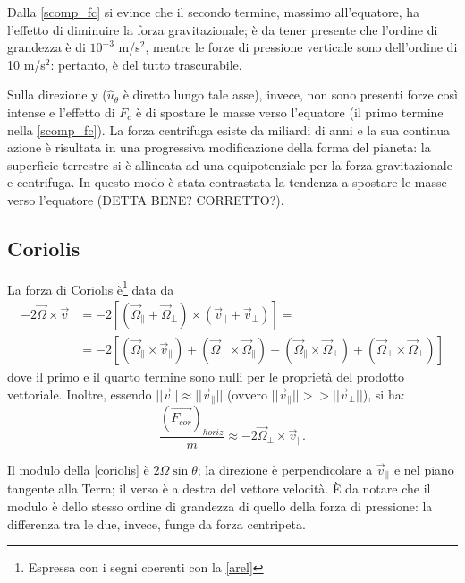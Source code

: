 Dalla \eqref{scomp_fc} si evince che il secondo termine, massimo all'equatore, ha l'effetto di diminuire la forza gravitazionale; è da tener presente che l'ordine di grandezza è di $10^{-3}$ m/s$^2$, mentre le forze di pressione verticale sono dell'ordine di 10 m/s$^2$: pertanto, è del tutto trascurabile.

Sulla direzione y ($\hat{u}_\theta$ è diretto lungo tale asse), invece, non sono presenti forze così intense e l'effetto di $F_c$ è di spostare le masse verso l'equatore (il primo termine nella \eqref{scomp_fc}). La forza centrifuga esiste da miliardi di anni e la sua continua azione è risultata in una progressiva modificazione della forma del pianeta: la superficie terrestre si è allineata ad una  equipotenziale per la forza gravitazionale e centrifuga. In questo modo è stata contrastata la tendenza a spostare le masse verso l'equatore (DETTA BENE? CORRETTO?).

\subsection{Coriolis}
La forza di Coriolis è\footnote{Espressa con i segni coerenti con la \eqref{arel}} data da
\begin{align}
	-2\vec{\Omega}\times\vec{v}&=-2[(\vec{\Omega}_{\parallel}+\vec{\Omega}_\perp)\times(\vec{v}_\parallel+\vec{v}_\perp)]=\\
	&=-2[(\vec{\Omega}_\parallel\times\vec{v}_\parallel)+(\vec{\Omega}_\perp\times\vec{\Omega}_\parallel)+(\vec{\Omega}_\parallel\times\vec{\Omega}_\perp)+(\vec{\Omega}_\perp\times\vec{\Omega}_\perp)]
\end{align}
dove il primo e il quarto termine sono nulli per le proprietà del prodotto vettoriale. Inoltre, essendo $||\vec{v}||\approx||\vec{v}_\parallel||$ (ovvero $||\vec{v}_\parallel||>>||\vec{v}_\perp||$), si ha:
\begin{equation}\label{coriolis}
	\frac{(\vec{F_{cor}})_{horiz}}{m}\approx-2\vec{\Omega}_\perp\times\vec{v}_\parallel.
\end{equation}

Il modulo della \eqref{coriolis} è $2\Omega\sin\theta$; la direzione  è perpendicolare a $\vec{v}_\parallel$ e nel piano tangente alla Terra; il verso è a destra del vettore velocità. È da notare che il modulo è dello stesso ordine di grandezza di quello della forza di pressione: la differenza tra le due, invece, funge da forza centripeta.

